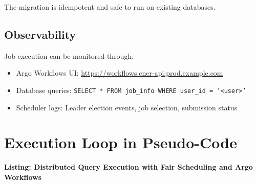 \documentclass[11pt]{article}
\begin{document}
The migration is idempotent and safe to run on existing databases.

\subsection{Observability}

Job execution can be monitored through:
\begin{itemize}
\item Argo Workflows UI: \url{https://workflows.cncr-api.prod.example.com}
\item Database queries: \texttt{SELECT * FROM job\_info WHERE user\_id = '<user>'}
\item Scheduler logs: Leader election events, job selection, submission status
\end{itemize}

\newpage
\section{Execution Loop in Pseudo-Code}
\noindent\textbf{Listing: Distributed Query Execution with Fair Scheduling and Argo Workflows}
\end{document}
